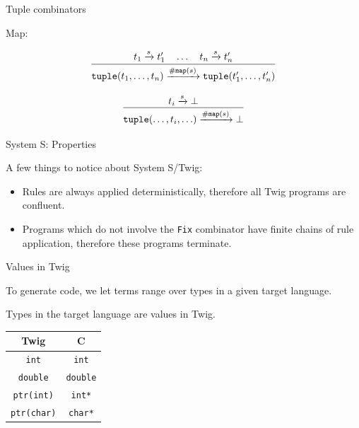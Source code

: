 \documentclass{beamer}
\newcommand{\arr}[1]{\ensuremath\xrightarrow{#1}}
\begin{document}
\begin{frame}{Tuple combinators}

Map:

\[
\infer{
  \mathtt{tuple}(t_1,\ldots,t_n)
  \arr{\mathtt{\#map}(s)}
  \mathtt{tuple}(t_1',\ldots,t_n')
}{t_1 \arr{s} t_1' \quad \ldots \quad t_n \arr{s} t_n'}
\]

\[
\infer
{\mathtt{tuple}(\ldots,t_i,\ldots) \arr{\mathtt{\#map}(s)} \bot}
{t_i \arr{s} \bot}
\]

\end{frame}


\begin{frame}{System S: Properties}

A few things to notice about System S/Twig:

\begin{itemize}

\item Rules are always applied deterministically, therefore all Twig programs
are confluent.

\item Programs which do not involve the \texttt{Fix} combinator have finite
chains of rule application, therefore these programs terminate.

\end{itemize}

\end{frame}


\begin{frame}{Values in Twig}

To generate code, we let terms range over types in a given target language.

Types in the target language are values in Twig.

\begin{center}
\begin{tabular}{c | c}
  Twig               & C \\
  \hline                       
  \texttt{int}       & \texttt{int}    \\
  \texttt{double}    & \texttt{double} \\
  \texttt{ptr(int)}  & \texttt{int*}   \\
  \texttt{ptr(char)} & \texttt{char*}  \\
\end{tabular}
\end{center}

\end{frame}
\end{document}
